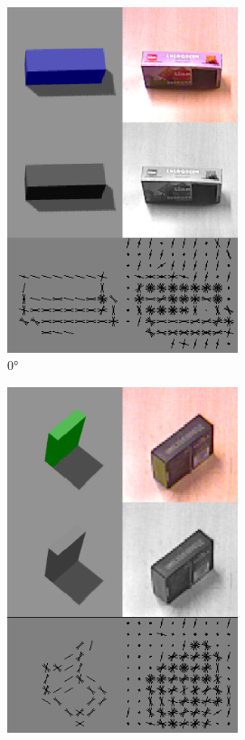 \documentclass[letterpaper, 10 pt, conference]{conf/ieeeconf}  %
\begin{document}
\begin{figure}[H]
  \centering
  \begin{subfigure}[b]{0.238\textwidth}
    \centering
    \includegraphics[width=0.74\textwidth]{simulation_vs_real_world_base_case.png}
    \caption{\label{fig:simulation_vs_real_world_0}\ang{0}}
  \end{subfigure}
  \begin{subfigure}[b]{0.238\textwidth}
    \centering
    \includegraphics[width=0.74\textwidth]{simulation_vs_real_world_broken.png}

\end{subfigure}
\end{figure}
\end{document}
